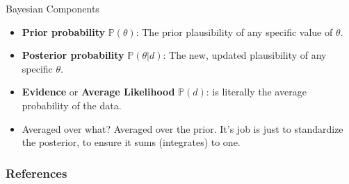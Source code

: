 \documentclass[handout]{beamer}
\begin{document}
\begin{frame}{Bayesian Components}
\scriptsize{
\begin{itemize}
\item \textbf{Prior probability} $\mathbb{P}(\theta)$: The prior plausibility of any specific value of $\theta$.
\item \textbf{Posterior probability} $\mathbb{P}(\theta|d)$: The new, updated plausibility of any specific $\theta$. 

\item \textbf{Evidence} or \textbf{Average Likelihood} $\mathbb{P}(d)$: is literally the average probability of the data. 
\item Averaged over what? Averaged over the prior. It’s job is just to standardize the posterior, to ensure it sums (integrates) to one.
 
\end{itemize}
 } 

\end{frame}


\begin{frame}[allowframebreaks]\scriptsize
\frametitle{References}


%
\end{frame}  









\end{document}

